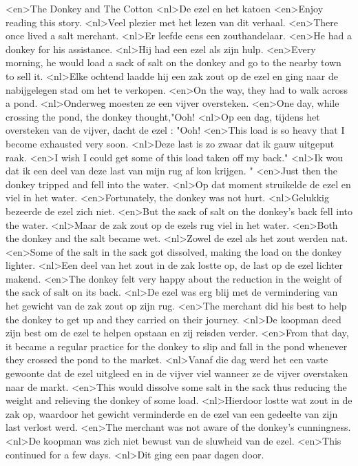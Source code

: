 <en>The Donkey and The Cotton
<nl>De ezel en het katoen
<en>Enjoy reading this story.
<nl>Veel plezier met het lezen van dit verhaal.
<en>There once lived a salt merchant.
<nl>Er leefde eens een zouthandelaar.
<en>He had a donkey for his assistance.
<nl>Hij had een ezel als zijn  hulp.
<en>Every morning, he would load a sack of salt on the donkey and go to the nearby town to sell it.
<nl>Elke ochtend laadde hij een zak zout op de ezel en ging naar de nabijgelegen stad om het te verkopen.
<en>On the way, they had to walk across a pond.
<nl>Onderweg moesten ze een vijver oversteken.
<en>One day, while crossing the pond, the donkey thought,"Ooh!
<nl>Op een dag, tijdens het oversteken van de vijver, dacht de ezel : "Ooh!
<en>This load is so heavy that I become exhausted very soon.
<nl>Deze last is zo zwaar dat ik gauw uitgeput raak.
<en>I wish I could get some of this load taken off my back."
<nl>Ik wou dat ik een deel van deze last van mijn rug af kon krijgen. "
<en>Just then the donkey tripped and fell into the water.
<nl>Op dat moment struikelde de ezel en viel in het water.
<en>Fortunately, the donkey was not hurt.
<nl>Gelukkig bezeerde  de ezel zich niet.
<en>But the sack of salt on the donkey’s back fell into the water.
<nl>Maar de zak zout op de ezels rug viel in het water.
<en>Both the donkey and the salt became wet.
<nl>Zowel de ezel als het zout werden nat.
<en>Some of the salt in the sack got dissolved, making the load on the donkey lighter.
<nl>Een deel van het zout in de zak lostte op, de last op de ezel lichter makend.
<en>The donkey felt very happy about the reduction in the weight of the sack of salt on its back.
<nl>De ezel was erg blij met de vermindering van het gewicht van de zak zout op zijn rug.
<en>The merchant did his best to help the donkey to get up and they carried on their journey.
<nl>De koopman deed zijn best om de ezel te helpen opstaan en zij reisden verder.
<en>From that day, it became a regular practice for the donkey to slip and fall in the pond whenever they crossed the pond to the market.
<nl>Vanaf die dag werd het een vaste gewoonte dat de ezel uitgleed en in de vijver viel wanneer ze de vijver overstaken naar de markt.
<en>This would dissolve some salt in the sack thus reducing the weight and relieving the donkey of some load.
<nl>Hierdoor lostte wat zout in de zak op, waardoor het gewicht verminderde en de ezel van een gedeelte van zijn last verlost werd.
<en>The merchant was not aware of the donkey’s cunningness.
<nl>De koopman was zich niet bewust van de sluwheid van de ezel.
<en>This continued for a few days.
<nl>Dit ging een paar dagen door.

